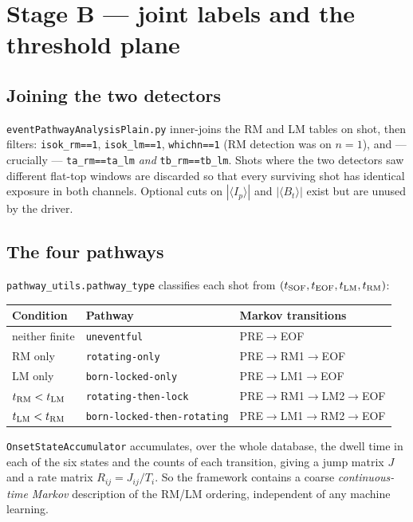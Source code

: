 \documentclass[11pt,a4paper]{article}
\newcommand{\code}[1]{\texttt{\small #1}}
\newcommand{\bk}{\discretionary{}{}{}}   %
\begin{document}
\section{Stage B --- joint labels and the threshold plane}

\subsection{Joining the two detectors}

\code{eventPathway\bk Analysis\bk Plain.py} inner-joins the RM and LM tables on shot, then filters:
\code{isok\_rm==1}, \code{isok\_lm==1}, \code{whichn==1} (RM detection was on $n=1$), and
--- crucially --- \code{ta\_rm==ta\_lm} \emph{and} \code{tb\_rm==tb\_lm}. Shots where the two
detectors saw different flat-top windows are discarded so that every surviving shot has identical
exposure in both channels. Optional cuts on $|\langle I_p\rangle|$ and $|\langle B_t\rangle|$ exist
but are unused by the driver.

\subsection{The four pathways}

\code{pathway\_utils.pathway\_type} classifies each shot from $(t_{\rm SOF},t_{\rm EOF},t_{\rm LM},t_{\rm RM})$:

\begin{center}
\begin{tabular}{@{}lll@{}}
\toprule
Condition & Pathway & Markov transitions \\
\midrule
neither finite & \code{uneventful} & PRE$\to$EOF \\
RM only & \code{rotating-only} & PRE$\to$RM1$\to$EOF \\
LM only & \code{born-locked-only} & PRE$\to$LM1$\to$EOF \\
$t_{\rm RM}<t_{\rm LM}$ & \code{rotating-then-lock} & PRE$\to$RM1$\to$LM2$\to$EOF \\
$t_{\rm LM}<t_{\rm RM}$ & \code{born-locked-then-rotating} & PRE$\to$LM1$\to$RM2$\to$EOF \\
\bottomrule
\end{tabular}
\end{center}

\code{OnsetStateAccumulator} accumulates, over the whole database, the dwell time in each of the six
states and the counts of each transition, giving a jump matrix $J$ and a rate matrix
$R_{ij} = J_{ij}/T_i$. So the framework contains a coarse \emph{continuous-time Markov} description
of the RM/LM ordering, independent of any machine learning.
\end{document}

